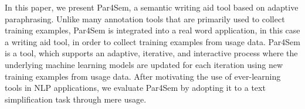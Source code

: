 In this paper, we present Par4Sem, a semantic writing aid tool based on adaptive paraphrasing. Unlike many annotation tools that are primarily used to collect training examples, Par4Sem is integrated into a real word application, in this case a writing aid tool, in order to collect training examples from usage data. Par4Sem is a tool, which supports an adaptive, iterative, and interactive process where the underlying machine learning models are updated for each iteration using new training examples from usage data. After motivating the use of ever-learning tools in NLP applications, we evaluate Par4Sem by adopting it to a text simplification task through mere usage.
